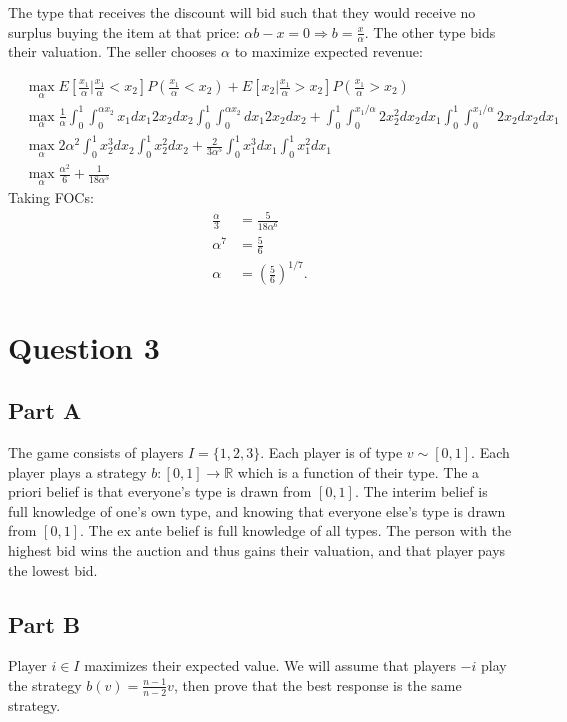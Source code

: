 \documentclass[11pt]{article} %
\begin{document}
The type that receives the discount will bid such that they would receive no surplus buying the item at that price: $\alpha b - x = 0\Rightarrow b = \frac{x}{\alpha}$. The other type bids their valuation. The seller chooses $\alpha$ to maximize expected revenue:

\begin{align*}
&\max_{\alpha} E\left[\frac{x_1}{\alpha}|\frac{x_1}{\alpha}<x_2\right] P\left(\frac{x_1}{\alpha}<x_2\right) + E\left[x_2|\frac{x_1}{\alpha}>x_2\right] P\left(\frac{x_1}{\alpha}>x_2\right)\\
&\max_{\alpha} \frac{1}{\alpha}\int_{0}^1\int_{0}^{\alpha x_2} x_1 dx_1 2x_2 dx_2 \int_{0}^1\int_{0}^{\alpha x_2} dx_1 2x_2 dx_2 + \int_{0}^1\int_{0}^{x_1/\alpha} 2x_2^2 dx_2 dx_1 \int_{0}^1\int_{0}^{x_1/\alpha}2x_2 dx_2  dx_1 \\
&\max_{\alpha} 2\alpha^2\int_{0}^1 x_2^3  dx_2 \int_{0}^1 x_2^2 dx_2 + \frac{2}{3\alpha^5}\int_{0}^1 x_1^3 dx_1 \int_{0}^1 x_1^2 dx_1 \\
&\max_{\alpha} \frac{\alpha^2}{6}+ \frac{1}{18\alpha^5} 
\end{align*}
Taking FOCs:
\begin{align*}
\frac{\alpha}{3} &= \frac{5}{18\alpha^6}\\
\alpha^7 &= \frac{5}{6}\\
\alpha &= \left( \frac{5}{6} \right)^{1/7}.
\end{align*}

\section{Question 3}
\subsection{Part A}
The game consists of players $I = \{ 1,2,3\}$. Each player is of type $v \sim  [0,1]$. Each player plays a strategy $b:[0,1]\rightarrow \mathbb{R}$ which is a function of their type. The a priori belief is that everyone's type is drawn from $[0,1]$. The interim belief is full knowledge of one's own type, and knowing that everyone else's type is drawn from $[0,1]$. The ex ante belief is full knowledge of all types. The person with the highest bid wins the auction and thus gains their valuation, and that player pays the lowest bid.
\subsection{Part B}
Player $i\in I$ maximizes their expected value. We will assume that  players $-i$ play the strategy $b(v) = \frac{n-1}{n-2}v $, then prove that the best response is the same strategy.
\end{document}
